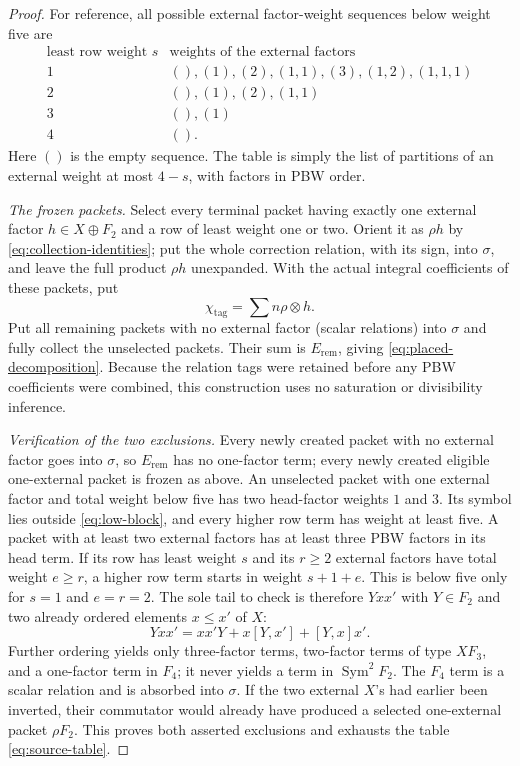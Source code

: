 \documentclass[11pt]{amsart}
\newcommand{\Sym}{\operatorname{Sym}}
\begin{document}
\begin{proof}
For reference, all possible external factor-weight sequences below
weight five are
\begin{equation}\label{eq:source-table}
\begin{array}{c|l}
\text{least row weight }s&\text{weights of the external factors}\\ \hline
1&(),(1),(2),(1,1),(3),(1,2),(1,1,1)\\
2&(),(1),(2),(1,1)\\
3&(),(1)\\
4&().
\end{array}
\end{equation}
Here $()$ is the empty sequence.  The table is simply the list of
partitions of an external weight at most $4-s$, with factors in PBW
order.

\pagebreak
\emph{The frozen packets.}
Select every terminal packet having exactly one external factor
$h\in X\oplus F_2$ and a row of least weight one or two.  Orient it
as $\rho h$ by \eqref{eq:collection-identities}; put the whole
correction relation, with its sign, into $\sigma$, and leave the full product
$\rho h$ unexpanded.  With the actual integral coefficients of these
packets, put
\[
                         \chi_{\mathrm{tag}}=\sum n\rho\otimes h.
\]
Put all remaining packets with no external factor (scalar relations)
into $\sigma$ and fully collect
the unselected packets.  Their sum is $E_{\mathrm{rem}}$, giving
\eqref{eq:placed-decomposition}.  Because the relation tags were
retained before any PBW coefficients were combined, this construction
uses no saturation or divisibility inference.

\emph{Verification of the two exclusions.}
Every newly created packet with no external factor goes into $\sigma$,
so $E_{\mathrm{rem}}$ has no one-factor term; every newly created
eligible one-external packet is frozen as above.  An unselected packet
with one external factor and total weight below five has two
head-factor weights $1$ and $3$.  Its symbol lies outside
\eqref{eq:low-block}, and every higher row term has weight at least
five.  A packet with at least two external factors has at least three
PBW factors in its head term.  If
its row has least weight $s$ and its $r\geq2$ external factors have
total weight $e\geq r$, a higher row term starts in weight
$s+1+e$.  This is below five only for $s=1$ and $e=r=2$.  The sole
tail to check is therefore $Yxx'$ with
$Y\in F_2$ and two already ordered elements $x\leq x'$ of $X$:
\[
 Yxx'=xx'Y+x[Y,x']+[Y,x]x'.
\]
Further ordering yields only three-factor terms, two-factor terms of
type $X F_3$, and a one-factor term in $F_4$; it never yields a term
in $\Sym^2F_2$.  The $F_4$ term is a scalar relation and is absorbed
into $\sigma$.  If the two external $X$'s had earlier been inverted,
their commutator would already have produced a selected one-external
packet $\rho F_2$.  This proves both asserted exclusions and exhausts
the table \eqref{eq:source-table}.
\end{proof}
\end{document}
